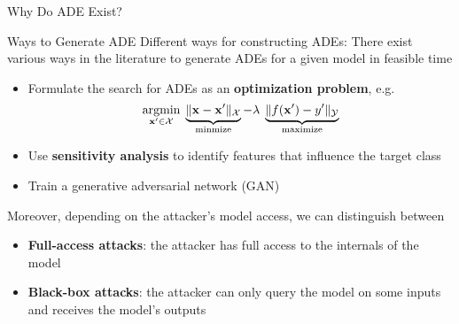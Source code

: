\documentclass[11pt,compress,t,notes=noshow, aspectratio=169, xcolor=table]{beamer}
\begin{document}
\begin{frame}{Why Do ADE Exist?}
    
\end{frame}


\begin{vbframe}[c]{Ways to Generate ADE}
Different ways for constructing ADEs:
There exist various ways in the literature to generate ADEs for a given model in feasible time
\begin{itemize}
    \item Formulate the search for ADEs as an \textbf{optimization problem}, e.g. 
    \begin{equation*}
        \label{eq:optimization}
        \underset{\mathbf{x}'\in \mathcal{X}}{\text{argmin}}\; \underbrace{\| \mathbf{x}-\mathbf{x}' \|_{\mathcal{X}}}_{\text{minmize}} - \lambda\;   \underbrace{ \|f(\mathbf{x}')-y'\|_{\mathcal{Y}}}_{\text{maximize}}
    \end{equation*}
    \item Use \textbf{sensitivity analysis} to identify features that influence the target class
    \item Train a generative adversarial network (GAN) 
\end{itemize}
Moreover, depending on the attacker's model access, we can distinguish between
\begin{itemize}
    \item \textbf{Full-access attacks}: the attacker has full access to the internals of the model
    \item \textbf{Black-box attacks}: the attacker can only query the model on some inputs and receives the model's outputs
\end{itemize}
\end{vbframe}
\end{document}
